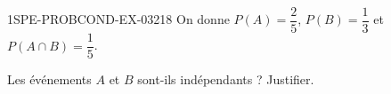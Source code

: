 \begin{exercice}{1SPE-PROBCOND-EX-032}{1}{8}
On donne $P(A) = \dfrac{2}{5}$, $P(B) = \dfrac{1}{3}$ et $P(A \cap B) = \dfrac{1}{5}$.

Les événements $A$ et $B$ sont-ils indépendants ? Justifier.
\end{exercice}

